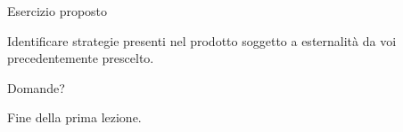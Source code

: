 \documentclass{beamer}
\begin{document}
\begin{frame}
{\centerline{Esercizio proposto}}
\vspace{1cm}
\begin{center}
    \LARGE{Identificare strategie presenti nel prodotto soggetto a esternalit\`{a} da voi precedentemente prescelto.}
\end{center}

\end{frame}


\begin{frame}
{\centerline{Domande?}}
\vspace{1cm}
\begin{center}
    \LARGE{Fine della prima lezione.}
\end{center}

\end{frame}
\end{document}
